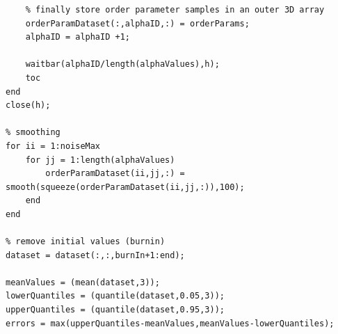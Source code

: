 \documentclass[12pt,A4,titlepage]{article}
\begin{document}
\begin{lstlisting}
    % finally store order parameter samples in an outer 3D array
    orderParamDataset(:,alphaID,:) = orderParams;
    alphaID = alphaID +1;
    
    waitbar(alphaID/length(alphaValues),h);
    toc
end
close(h);

% smoothing
for ii = 1:noiseMax
    for jj = 1:length(alphaValues)
        orderParamDataset(ii,jj,:) = smooth(squeeze(orderParamDataset(ii,jj,:)),100);
    end
end

% remove initial values (burnin)
dataset = dataset(:,:,burnIn+1:end);

meanValues = (mean(dataset,3));
lowerQuantiles = (quantile(dataset,0.05,3));
upperQuantiles = (quantile(dataset,0.95,3));
errors = max(upperQuantiles-meanValues,meanValues-lowerQuantiles);
\end{lstlisting}
\end{document}
